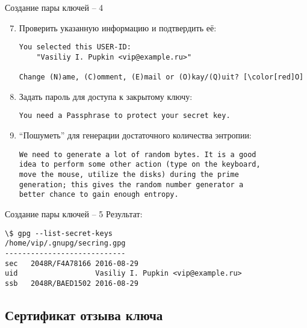 \documentclass[presentation]{beamer}
\begin{document}
\begin{frame}[fragile]{Создание пары ключей -- 4}
  \begin{enumerate}
  \setcounter{enumi}{6}
\item Проверить указанную информацию и подтвердить её:
  \begin{Verbatim}[commandchars=\\\[\]]
You selected this USER-ID:
    "Vasiliy I. Pupkin <vip@example.ru>"

Change (N)ame, (C)omment, (E)mail or (O)kay/(Q)uit? [\color[red]O]
  \end{Verbatim}

\item Задать пароль для доступа к закрытому ключу:
  \begin{Verbatim}[commandchars=\\\[\]]
You need a Passphrase to protect your secret key.
  \end{Verbatim}

\item ``Пошуметь'' для генерации достаточного количества энтропии:
  \begin{Verbatim}[commandchars=\\\[\]]
We need to generate a lot of random bytes. It is a good 
idea to perform some other action (type on the keyboard,
move the mouse, utilize the disks) during the prime
generation; this gives the random number generator a
better chance to gain enough entropy.
  \end{Verbatim}
\end{enumerate}
\end{frame}

\begin{frame}[fragile]{Создание пары ключей -- 5}
  Результат:
  \begin{Verbatim}[commandchars=\\\[\]]
\$ gpg --list-secret-keys
/home/vip/.gnupg/secring.gpg
----------------------------
sec   2048R/F4A78166 2016-08-29
uid                  Vasiliy I. Pupkin <vip@example.ru>
ssb   2048R/BAED1502 2016-08-29
  \end{Verbatim}
\end{frame}


\subsection{Сертификат отзыва ключа}
\end{document}
